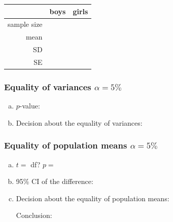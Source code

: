 		\begin{multicols}{2}
		\begin{center}
			\begin{tabular}{r|C{2cm}|C{2cm}}
			\toprule
						& boys & girls\\
			\midrule
			sample size	&&\\
			mean		&&\\
			SD		&&\\
			SE			&&\\
			\bottomrule
			\end{tabular}
		\end{center}

\subsubsection*{Equality of variances $\alpha=5\%$}
		\begin{enumerate}[a)]
		\item $p$-value: \hrulefill	
		\item Decision about the equality of variances:	
		
		\hrulefill
		\end{enumerate}
		\end{multicols}
\subsubsection*{Equality of population means $\alpha=5\%$}
		\begin{enumerate}[a)]
		\item $t=$ \hrulefill \quad df?	\hrulefill\quad			$p=$ \hrulefill
		\item 95\% CI of the difference: \hrulefill
		\item Decision about the equality of population means: \hrulefill

			Conclusion: \hrulefill		
		\end{enumerate}



